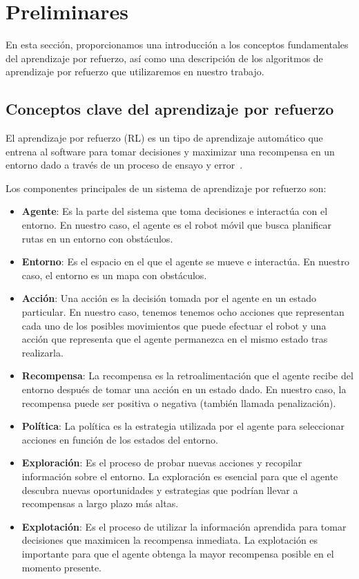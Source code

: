 \documentclass[conference,a4paper]{IEEEtran}
\begin{document}
\section{Preliminares}

En esta sección, proporcionamos una introducción a los conceptos fundamentales del aprendizaje por refuerzo,
así como una descripción de los algoritmos de aprendizaje por refuerzo que utilizaremos en nuestro trabajo.

\subsection{Conceptos clave del aprendizaje por refuerzo}

El aprendizaje por refuerzo (RL) es un tipo de aprendizaje automático que entrena al software para tomar decisiones y maximizar una recompensa en un entorno dado a través de 
un proceso de ensayo y error~\cite{b7}.\newline

Los componentes principales de un sistema de aprendizaje por refuerzo son:

\begin{itemize}
  \item \textbf{Agente}: Es la parte del sistema que toma decisiones e interactúa con el entorno. En nuestro caso, el agente es el robot móvil que busca planificar rutas en un entorno con obstáculos.
  \item \textbf{Entorno}: Es el espacio en el que el agente se mueve e interactúa. En nuestro caso, el entorno es un mapa con obstáculos.
  \item \textbf{Acción}: Una acción es la decisión tomada por el agente en un estado particular. En nuestro caso, tenemos tenemos ocho acciones que representan cada uno de los posibles movimientos que puede efectuar el robot y una 
    acción que representa que el agente permanezca en el mismo estado tras realizarla.
  \item \textbf{Recompensa}: La recompensa es la retroalimentación que el agente recibe del entorno después de tomar una acción en un estado dado. En nuestro caso, la recompensa puede ser positiva o negativa (también llamada penalización).
  \item \textbf{Política}: La política es la estrategia utilizada por el agente para seleccionar acciones en función de los estados del entorno. 
  \item \textbf{Exploración}: Es el proceso de probar nuevas acciones y recopilar información sobre el entorno. La exploración es esencial para que el agente descubra nuevas oportunidades y estrategias que podrían llevar a recompensas a largo plazo más altas.
  \item \textbf{Explotación}: Es el proceso de utilizar la información aprendida para tomar decisiones que maximicen la recompensa inmediata. La explotación es importante para que el agente obtenga la mayor recompensa posible en el momento presente.
\end{itemize}
\end{document}
